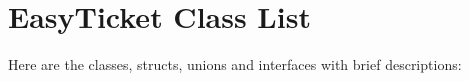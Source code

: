 \section{Easy\-Ticket Class List}
Here are the classes, structs, unions and interfaces with brief descriptions:\begin{CompactList}
\item{}
\end{CompactList}
